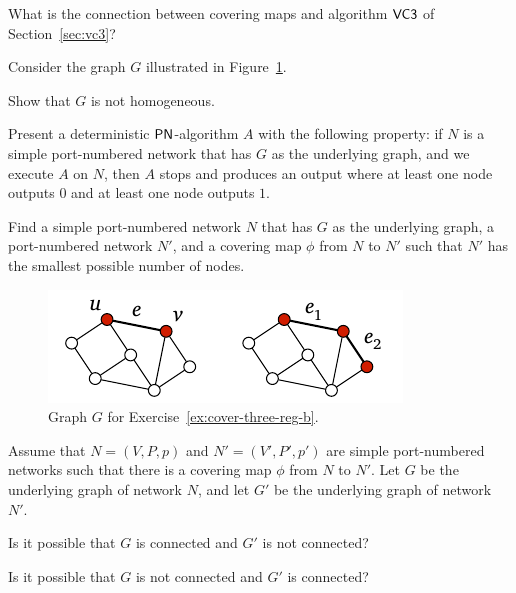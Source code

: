 \begin{ex}\label{ex:cover-cover}
    What is the connection between covering maps and algorithm $\textup{\sffamily VC3}$ of Section~\ref{sec:vc3}?
\end{ex}

\begin{exs}\label{ex:cover-three-reg-b}
    Consider the graph $G$ illustrated in Figure~\ref{fig:cover-ex-three-reg-b}.
    \begin{subex}
        \item Show that $G$ is not homogeneous.
        \item Present a deterministic $\textup{\sffamily PN}$-algorithm $A$ with the following property: if $N$ is a simple port-numbered network that has $G$ as the underlying graph, and we execute $A$ on $N$, then $A$ stops and produces an output where at least one node outputs $0$ and at least one node outputs $1$.
        \item Find a simple port-numbered network $N$ that has $G$ as the underlying graph, a port-numbered network $N'$, and a covering map $\phi$ from $N$ to $N'$ such that $N'$ has the smallest possible number of nodes.
    \end{subex}

    \begin{figure}
        \centering
        \includegraphics[page=\PCoverExThreeRegB]{figs.pdf}
        \caption{Graph $G$ for Exercise~\ref{ex:cover-three-reg-b}.}\label{fig:cover-ex-three-reg-b}
    \end{figure}
\end{exs}

\begin{exs}
    Assume that $N = (V,P,p)$ and $N' = (V'\!,P'\!,p')$ are simple port-numbered networks such that there is a covering map $\phi$ from $N$ to $N'$. Let $G$ be the underlying graph of network $N$, and let $G'$ be the underlying graph of network~$N'$.
    \begin{subex}
        \item Is it possible that $G$ is connected and $G'$ is not connected?
        \item Is it possible that $G$ is not connected and $G'$ is connected?
    \end{subex}
\end{exs}

